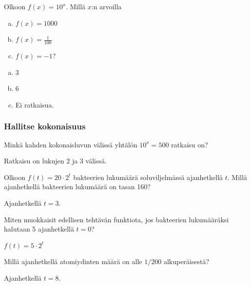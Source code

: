 \begin{tehtava}
Olkoon $f(x) = 10^x$. Millä $x$:n arvoilla
\begin{enumerate}[a)]
\item $f(x) = 1000$
\item $f(x) = \frac{1}{100}$
\item $f(x) = -1$?
\end{enumerate}
\begin{vastaus}
\begin{enumerate}[a)]
\item $3$
\item $6$
\item Ei ratkaisua.
\end{enumerate}
\end{vastaus}
\end{tehtava}

\subsubsection*{Hallitse kokonaisuus}
\begin{tehtava}
Minkä kahden kokonaisluvun välissä yhtälön
$10^x = 500$ ratkaisu on?
\begin{vastaus}
Ratkaisu on lukujen $2$ ja $3$ välissä.
\end{vastaus}
\end{tehtava}


\begin{tehtava}
Olkoon $f(t) = 20 \cdot 2^t$ bakteerien lukumäärä soluviljelmässä
ajanhetkellä $t$. Millä ajanhetkellä bakteerien lukumäärä on tasan 160?
\begin{vastaus}
Ajanhetkellä $t = 3$.
\end{vastaus}
\end{tehtava}

\begin{tehtava}
Miten muokkaisit edellisen tehtävän funktiota, jos bakteerien lukumääräksi
halutaan 5 ajanhetkellä $t = 0$?
\begin{vastaus}
$f(t) = 5 \cdot 2^t$
\end{vastaus}
\end{tehtava}

\begin{tehtava}
Millä ajanhetkellä atomiydinten määrä on alle $1/200$ alkuperäisestä?
\begin{vastaus}
Ajanhetkellä $t = 8$.
\end{vastaus}
\end{tehtava}

